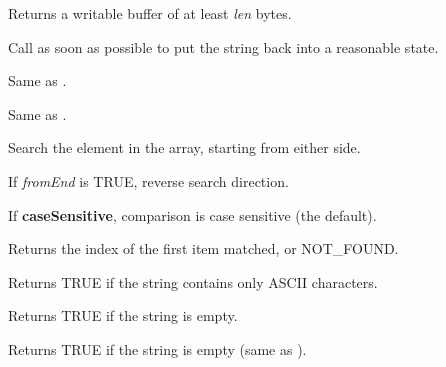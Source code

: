 \label{wxstringgetwritebuf}


Returns a writable buffer of at least {\it len} bytes.

Call  as soon as possible
to put the string back into a reasonable state.

\label{wxstringindex}


Same as .


Same as .


Search the element in the array, starting from either side.

If {\it fromEnd} is TRUE, reverse search direction.

If {\bf caseSensitive}, comparison is case sensitive (the default).

Returns the index of the first item matched, or NOT\_FOUND.

%
%
\label{wxstringisascii}


Returns TRUE if the string contains only ASCII characters.

\label{wxstringisempty}


Returns TRUE if the string is empty.

\label{wxstringisnull}


Returns TRUE if the string is empty (same as ).

\label{wxstringisnumber}


